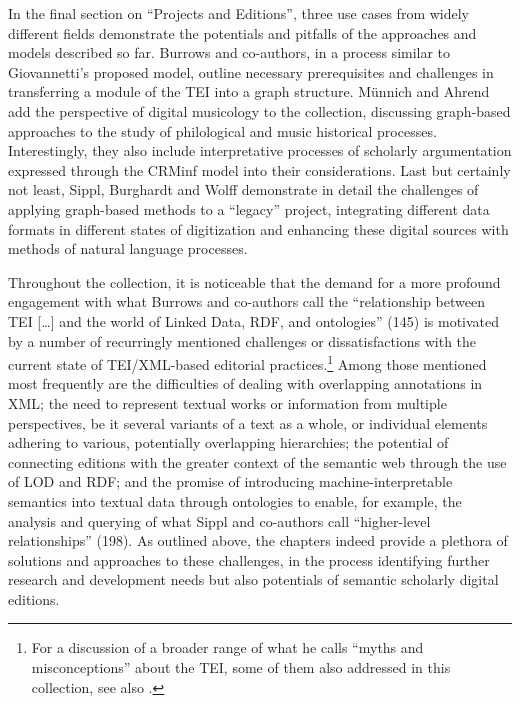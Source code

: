 \begin{review}
In the final section on ``Projects and Editions'', three use cases from
widely different fields demonstrate the potentials and pitfalls of the
approaches and models described so far. Burrows and co-authors, in a
process similar to Giovannetti's proposed model, outline necessary
prerequisites and challenges in transferring a module of the TEI into a
graph structure. Münnich and Ahrend add the perspective of digital
musicology to the collection, discussing graph-based approaches to the
study of philological and music historical processes. Interestingly,
they also include interpretative processes of scholarly argumentation
expressed through the CRMinf model \parencite{stead_crminf_2015} into their
considerations. Last but certainly not least, Sippl, Burghardt and Wolff
demonstrate in detail the challenges of applying graph-based methods to
a ``legacy'' project, integrating different data formats in different
states of digitization and enhancing these digital sources with methods
of natural language processes.

Throughout the collection, it is noticeable that the demand for a more
profound engagement with what Burrows and co-authors call the
``relationship between TEI [\ldots] and the world of Linked Data,
RDF, and ontologies'' (145) is motivated by a number of recurringly
mentioned challenges or dissatisfactions with the current state of
TEI/XML-based editorial practices.\footnote{For a discussion of a
  broader range of what he calls ``myths and misconceptions'' about the
  TEI, some of them also addressed in this collection, see also \cite{cummings_world_2019}.} Among those mentioned most frequently are the difficulties of
dealing with overlapping annotations in XML; the need to represent
textual works or information from multiple perspectives, be it several
variants of a text as a whole, or individual elements adhering to
various, potentially overlapping hierarchies; the potential of
connecting editions with the greater context of the semantic web through
the use of LOD and RDF; and the promise of introducing
machine-interpretable semantics into textual data through ontologies to
enable, for example, the analysis and querying of what Sippl and
co-authors call ``higher-level relationships'' (198). As outlined above,
the chapters indeed provide a plethora of solutions and approaches to
these challenges, in the process identifying further research and
development needs but also potentials of semantic scholarly digital
editions.


\end{review}
